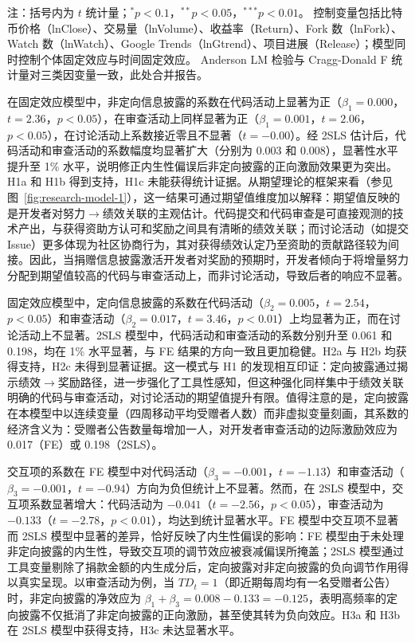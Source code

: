 \documentclass[
    type = master, %
    degree = professional,        %
    decl-page,  %
    twoside,                %
    fontset = fandol %
  ]{njuthesis}
\renewcommand{\footnotesize}{\zihao{-5}}
\begin{document}
\begin{table}[htbp]
\begin{tabularx}{\textwidth}{Xrrrrrr}
        \bottomrule
    \end{tabularx}
    \begin{minipage}{\textwidth}
        \vspace{0.3em}
        \footnotesize 注：括号内为 $t$ 统计量；$^{*}p<0.1$，$^{**}p<0.05$，$^{***}p<0.01$。
        控制变量包括比特币价格（lnClose）、交易量（lnVolume）、收益率（Return）、Fork 数（lnFork）、Watch 数（lnWatch）、Google Trends（lnGtrend）、项目进展（Release）；模型同时控制个体固定效应与时间固定效应。
        Anderson LM 检验与 Cragg-Donald F 统计量对三类因变量一致，此处合并报告。
    \end{minipage}
\end{table}

在固定效应模型中，非定向信息披露的系数在代码活动上显著为正（$\beta_1 = 0.000$，$t = 2.36$，$p < 0.05$），在审查活动上同样显著为正（$\beta_1 = 0.001$，$t = 2.06$，$p < 0.05$），在讨论活动上系数接近零且不显著（$t = -0.00$）。经 2SLS 估计后，代码活动和审查活动的系数幅度均显著扩大（分别为 0.003 和 0.008），显著性水平提升至 1\% 水平，说明修正内生性偏误后非定向披露的正向激励效果更为突出。H1a 和 H1b 得到支持，H1c 未能获得统计证据。从期望理论的框架来看（参见图~\ref{fig:research-model-1}），这一结果可通过期望值维度加以解释：期望值反映的是开发者对努力$\to$绩效关联的主观估计。代码提交和代码审查是可直接观测的技术产出，与获得资助方认可和奖励之间具有清晰的绩效关联；而讨论活动（如提交 Issue）更多体现为社区协商行为，其对获得绩效认定乃至资助的贡献路径较为间接。因此，当捐赠信息披露激活开发者对奖励的预期时，开发者倾向于将增量努力分配到期望值较高的代码与审查活动上，而非讨论活动，导致后者的响应不显著。

固定效应模型中，定向信息披露的系数在代码活动（$\beta_2 = 0.005$，$t = 2.54$，$p < 0.05$）和审查活动（$\beta_2 = 0.017$，$t = 3.46$，$p < 0.01$）上均显著为正，而在讨论活动上不显著。2SLS 模型中，代码活动和审查活动的系数分别升至 0.061 和 0.198，均在 1\% 水平显著，与 FE 结果的方向一致且更加稳健。H2a 与 H2b 均获得支持，H2c 未得到显著证据。这一模式与 H1 的发现相互印证：定向披露通过揭示绩效$\to$奖励路径，进一步强化了工具性感知，但这种强化同样集中于绩效关联明确的代码与审查活动，对讨论活动的期望值提升有限。值得注意的是，定向披露在本模型中以连续变量（四周移动平均受赠者人数）而非虚拟变量刻画，其系数的经济含义为：受赠者公告数量每增加一人，对开发者审查活动的边际激励效应为 0.017（FE）或 0.198（2SLS）。

交互项的系数在 FE 模型中对代码活动（$\beta_3 = -0.001$，$t = -1.13$）和审查活动（$\beta_3 = -0.001$，$t = -0.94$）方向为负但统计上不显著。然而，在 2SLS 模型中，交互项系数显著增大：代码活动为 $-0.041$（$t = -2.56$，$p < 0.05$），审查活动为 $-0.133$（$t = -2.78$，$p < 0.01$），均达到统计显著水平。FE 模型中交互项不显著而 2SLS 模型中显著的差异，恰好反映了内生性偏误的影响：FE 模型由于未处理非定向披露的内生性，导致交互项的调节效应被衰减偏误所掩盖；2SLS 模型通过工具变量剔除了捐款金额的内生成分后，定向披露对非定向披露的负向调节作用得以真实呈现。以审查活动为例，当 $TD_t = 1$（即近期每周均有一名受赠者公告）时，非定向披露的净效应为 $\beta_1 + \beta_3 = 0.008 - 0.133 = -0.125$，表明高频率的定向披露不仅抵消了非定向披露的正向激励，甚至使其转为负向效应。H3a 和 H3b 在 2SLS 模型中获得支持，H3c 未达显著水平。
\end{document}
